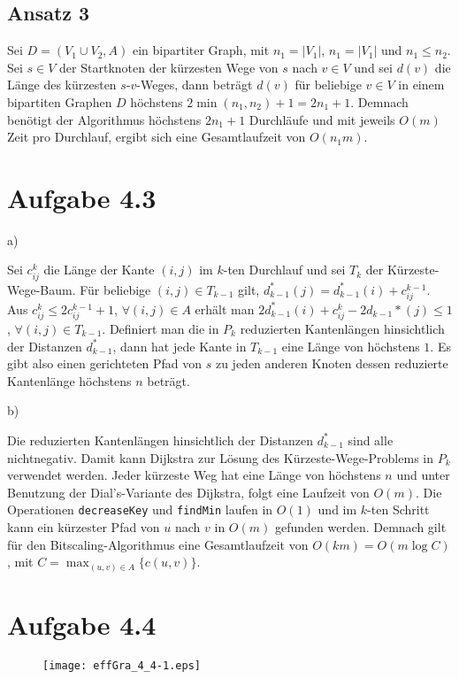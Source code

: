 \documentclass{scrartcl}
\begin{document}
\subsection*{Ansatz 3}

Sei $D= \left( V_{1} \cup V_{2}, A \right)$ ein bipartiter Graph, mit $n_{1} = \vert V_{1} \vert$, $n_{1} = \vert V_{1} \vert$ und $n_{1} \leq n_{2}$. Sei $s \in V$ der Startknoten der kürzesten Wege von $s$ nach $v \in V$ und sei $d(v)$ die Länge des kürzesten $s$-$v$-Weges, dann beträgt $d(v)$ für beliebige $v \in V$ in einem bipartiten Graphen $D$ höchstens $2 \min \left( n_{1}, n_{2} \right) + 1 = 2n_{1} + 1$. Demnach benötigt der Algorithmus höchstens $2n_{1} + 1$ Durchläufe und mit jeweils $O(m)$ Zeit pro Durchlauf, ergibt sich eine Gesamtlaufzeit von $O(n_{1}m)$.

\section{Aufgabe 4.3}
\begin{description}
\item[a)]
\end{description}
Sei $c_{ij}^{k}$ die Länge der Kante $(i,j)$ im $k$-ten Durchlauf und sei $T_{k}$ der Kürzeste-Wege-Baum. Für beliebige $(i,j) \in T_{k-1}$ gilt, $d_{k-1}^{*} (j) = d_{k-1}^{*} (i) + c_{ij}^{k-1}$. Aus $c_{ij}^{k} \leq 2c_{ij}^{k-1} + 1$, $\forall (i,j) \in A$ erhält man $2d_{k-1}^{*} (i) + c_{ij}^{k} - 2d_{k-1}{*} (j) \leq 1$, $\forall (i,j) \in T_{k-1}$. Definiert man die in $P_{k}$ reduzierten Kantenlängen hinsichtlich der Distanzen $d_{k-1}^{*}$, dann hat jede Kante in $T_{k-1}$ eine Länge von höchstens $1$. Es gibt also einen gerichteten Pfad von $s$ zu jeden anderen Knoten dessen reduzierte Kantenlänge höchstens $n$ beträgt.

\begin{description}
\item[b)]
\end{description}
Die reduzierten Kantenlängen hinsichtlich der Distanzen $d_{k-1}^{*}$ sind alle nichtnegativ. Damit kann Dijkstra  zur Lösung des Kürzeste-Wege-Problems in $P_{k}$ verwendet werden. Jeder kürzeste Weg hat eine Länge von höchstens $n$ und unter Benutzung der Dial's-Variante des Dijkstra, folgt eine Laufzeit von $O(m)$. Die Operationen \verb+decreaseKey+ und \verb+findMin+ laufen in $O(1)$ und im $k$-ten Schritt kann ein kürzester Pfad von $u$ nach $v$ in $O(m)$ gefunden werden. Demnach gilt für den Bitscaling-Algorithmus eine Gesamtlaufzeit von $O(km) = O(m \log C)$, mit $C = \max_{(u,v) \in A} \lbrace c(u,v) \rbrace$.
\newpage
\section{Aufgabe 4.4}
\begin{center}
\begin{figure}[h]
\texttt{[image: effGra\_4\_4-1.eps]}
\end{figure}
\end{center}
\end{document}
